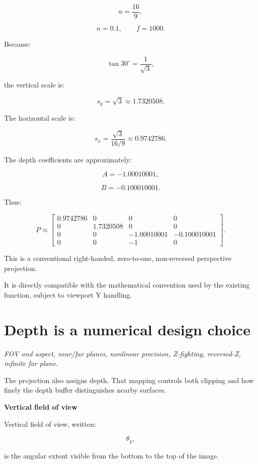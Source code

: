 \[
 a=\frac{16}{9},
\]

\[
 n=0.1,\qquad f=1000.
\]

Because:

\[
 \tan30^\circ=\frac1{\sqrt3},
\]

the vertical scale is:

\[
 s_y=\sqrt3\approx1.7320508.
\]

The horizontal scale is:

\[
 s_x=\frac{\sqrt3}{16/9} \approx0.9742786.
\]

The depth coefficients are approximately:

\[
 A=-1.00010001,
\]

\[
 B=-0.100010001.
\]

Thus:

\[
 \boxed{ P\approx \begin{bmatrix} 0.9742786&0&0&0\\ 0&1.7320508&0&0\\ 0&0&-1.00010001&-0.100010001\\ 0&0&-1&0 \end{bmatrix} }.
\]

This is a conventional right-handed, zero-to-one, non-reversed perspective projection.

It is directly compatible with the mathematical convention used by the existing  function, subject to viewport Y handling.

\section{Depth is a numerical design choice}\label{02-foundations-ii-ch033-depth-is-a-numerical-design-choice}

\hypertarget{02-foundations-ii-ch033-depth-is-a-numerical-design-choice}{}

\emph{FOV and aspect, near/far planes, nonlinear precision, Z-fighting, reversed-Z, infinite far plane.}

The projection also assigns depth. That mapping controls both clipping and how finely the depth buffer distinguishes nearby surfaces.

\textbf{Vertical field of view}

Vertical field of view, written:

\[
 \boxed{\theta_y},
\]

is the angular extent visible from the bottom to the top of the image.

